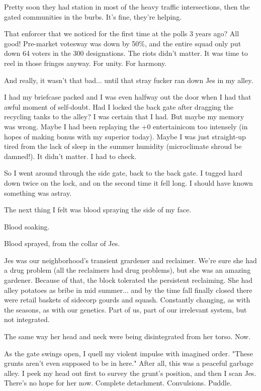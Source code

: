 \documentclass{amsbook}
\begin{document}
Pretty soon they had station in most of the heavy traffic intersections, then the gated communities in the burbs.  It's fine, they're helping.

That enforcer that we noticed for the first time at the polls 3 years
ago?  All good!  Pre-market votesway was down by 50\%, and the entire squad only put down 64 voters in the 300 designations.  The riots didn't matter.  It was time to reel in those fringes anyway.  For unity.  For harmony.

And really, it wasn't that bad... until that stray fucker ran down Jes in my alley.

I had my briefcase packed and I was even halfway out the door when I had that awful moment of self-doubt.  Had I locked the back gate after dragging the recycling tanks to the alley?  I was certain that I had.  But maybe my memory was wrong.  Maybe I had been replaying the +0 entertainicom too intensely (in hopes of making bonus with my superior today).  Maybe I was just straight-up tired from the lack of sleep in the summer humidity (microclimate shroud be damned!).  It didn't matter.  I had to check.

So I went around through the side gate, back to the back gate.  I tugged hard down twice on the lock, and on the second time it fell long.  I should have known something was astray.

The next thing I felt was blood spraying the side of my face.

Blood soaking.

Blood sprayed, from the collar of Jes. 

Jes was our neighborhood's transient grardener and reclaimer.  We're sure she had a drug problem (all the reclaimers had drug problems), but she was an amazing gardener.  Because of that, the block tolerated the persistent reclaiming.  She had alley potatoes as bribe in mid summer... and by the time fall finally closed there were retail baskets of sidecorp gourds and squash.  Constantly changing, as with the seasons, as with our genetics.  Part of us, part of our irrelevant system, but not integrated.

The same way her head and neck were being disintegrated from her torso.  Now.

As the gate swings open, I quell my violent impulse with imagined order.  "These grunts aren't even supposed to be in here."  After all, this was a peaceful garbage alley.  I peek my head out first to survey the grunt's position, and then I scan Jes.  There's no hope for her now.  Complete detachment.  Convulsions.  Puddle.
\end{document}
